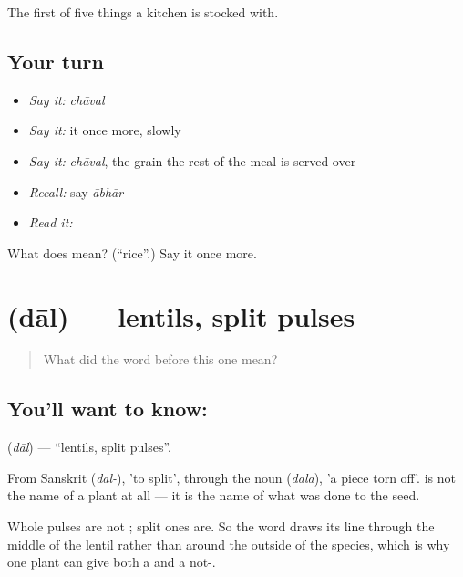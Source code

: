 \begin{grammarlens}[title={What you've built}]
The first of five things a kitchen is stocked with.
\end{grammarlens}

\subsection*{Your turn}
\begin{itemize}
\raggedright
  \item \emph{Say it:} \emph{chāval}
  \item \emph{Say it:} it once more, slowly
  \item \emph{Say it:} \emph{chāval}, the grain the rest of the meal is served over
  \item \emph{Recall:} say \emph{ābhār}
  \item \emph{Read it:} \textbf{}
\end{itemize}

\begin{tcolorbox}[breakable,colback=teal!4,colframe=teal!35!black,title={Before you move on}]
What does  mean? (\textquotedblleft{}rice\textquotedblright{}.) Say it once more.
\end{tcolorbox}
\section[\texorpdfstring{\hi{दाल} (dāl)}{दाल (dāl)}]{ (dāl) — lentils, split pulses}

\label{lesson:HI-C52-lentils}



\begin{quote}
What did the word before this one mean?
\end{quote}

\subsection*{You'll want to know: }
\textbf{} (\emph{dāl}) — \textquotedblleft{}lentils, split pulses\textquotedblright{}.

From Sanskrit  (\emph{dal-}), 'to split', through the noun  (\emph{dala}), 'a piece torn off'.  is not the name of a plant at all — it is the name of what was done to the seed.

Whole pulses are not ; split ones are. So the word draws its line through the middle of the lentil rather than around the outside of the species, which is why one plant can give both a  and a not-.

